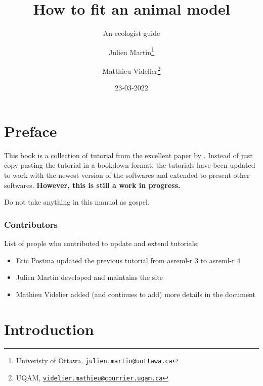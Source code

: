 \documentclass[
  12pt,
]{book}
\title{How to fit an animal model}
\subtitle{An ecologist guide}
\author{Julien Martin\footnote{Univeristy of Ottawa, \href{mailto:julien.martin@uottawa.ca}{\nolinkurl{julien.martin@uottawa.ca}}} \and Matthieu Videlier\footnote{UQAM, \href{mailto:videlier.mathieu@courrier.uqam.ca}{\nolinkurl{videlier.mathieu@courrier.uqam.ca}}}}
\date{23-03-2022}
\makeatletter
\providecommand{\tightlist}{%
  \setlength{\itemsep}{0pt}\setlength{\parskip}{0pt}}
\newenvironment{kframe}{%
\medskip{}
\setlength{\fboxsep}{.8em}
\def\at@end@of@kframe{}%
\ifinner\ifhmode%
 \def\at@end@of@kframe{\end{minipage}}%
 \begin{minipage}{\columnwidth}%
\fi\fi%
\def\FrameCommand##1{\hskip\@totalleftmargin \hskip-\fboxsep
\colorbox{incolor}{##1}\hskip-\fboxsep
    \hskip-\linewidth \hskip-\@totalleftmargin \hskip\columnwidth}%
\MakeFramed {\advance\hsize-\width
  \@totalleftmargin\z@ \linewidth\hsize
  \@setminipage}}%
{\par\unskip\endMakeFramed%
\at@end@of@kframe}
\newenvironment{rmdblock}[1]
 {
 \begin{itemize}
 \renewcommand{\labelitemi}{
   \raisebox{-.7\height}[0pt][0pt]{
     {\setkeys{Gin}{width=3em,keepaspectratio}\texttt{[image: images/\#1]}}
   }
 }
 \begin{kframe}
 \setlength{\fboxsep}{1em}
 \item
 }
 {
 \end{kframe}
 \end{itemize}
 }
\newenvironment{rmdwarning}
  {\begin{rmdblock}{warning}}
  {\end{rmdblock}}
\makeatother
\begin{document}
\maketitle



{
\setcounter{tocdepth}{1}
\tableofcontents
}
\hypertarget{preface}{%
\chapter*{Preface}\label{preface}}

This book is a collection of tutorial from the excellent paper by \citep{wilson2010}.
Instead of just copy pasting the tutorial in a bookdown format, the tutorials have been updated to work with the newest version of the softwares and extended to present other softwares.
\textbf{However, this is still a work in progress.}

\begin{rmdwarning}
Do not take anything in this manual as gospel.
\end{rmdwarning}

\hypertarget{contributors}{%
\subsection*{Contributors}\label{contributors}}

List of people who contributed to update and extend tutorials:

\begin{itemize}
\tightlist
\item
  Eric Postma updated the previous tutorial from asreml-r 3 to asreml-r 4
\item
  Julien Martin developed and maintains the site
\item
  Mathieu Videlier added (and continues to add) more details in the document
\end{itemize}

\hypertarget{intro}{%
\chapter{Introduction}\label{intro}}
\end{document}
